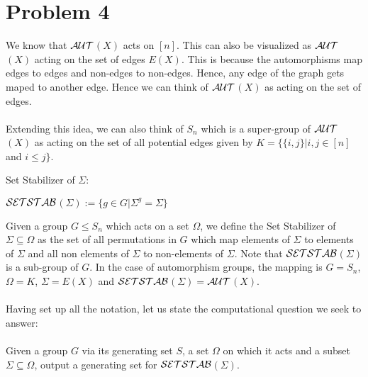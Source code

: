 \section{Problem 4}
We know that $\cal{AUT}$$(X)$ acts on $[n]$. This can also be visualized as $\cal{AUT}$$(X)$ acting on the set of edges $E(X)$. This is because the automorphisms map edges to edges and non-edges to non-edges. Hence, any edge of the graph gets maped to another edge. Hence we can think of $\cal{AUT}$$(X)$ as acting on the set of edges.\\\\
Extending this idea, we can also think of $S_n$ which is a super-group of $\cal{AUT}$$(X)$ as acting on the set of all potential edges given by $K = \{ \{i, j\} | i, j \in [n]$ and $i \le j\}$. 

\begin{definition}
	Set Stabilizer of $\Sigma$:
	\begin{center}
	$\cal{SETSTAB}$$(\Sigma) := \{ g \in G | \Sigma^{g} = \Sigma\}$
	\end{center}
\end{definition}
Given a group $G \le S_n$ which acts on a set $\Omega$, we define the Set Stabilizer of $\Sigma \subseteq \Omega$ as the set of all permutations in $G$ which map elements of $\Sigma$ to elements of $\Sigma$ and all non elements of $\Sigma$ to non-elements of $\Sigma$. Note that $\cal{SETSTAB}$$(\Sigma)$ is a sub-group of $G$. In the case of automorphism groups, the mapping is $G = S_n$, $\Omega = K$, $\Sigma = E(X)$ and $\cal{SETSTAB}$$(\Sigma)$$=$$\cal{AUT}$$(X)$.\\\\
Having set up all the notation, let us state the computational question we seek to answer:\\\\
Given a group $G$ via its generating set $S$, a set $\Omega$ on which it acts and a subset $\Sigma \subseteq \Omega$, output a generating set for $\cal{SETSTAB}$$(\Sigma)$.


